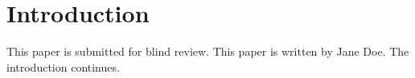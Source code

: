 \section{Introduction}
\ifanonymous
This paper is submitted for blind review. %
\else
This paper is written by Jane Doe. %
\fi
The introduction continues. %
